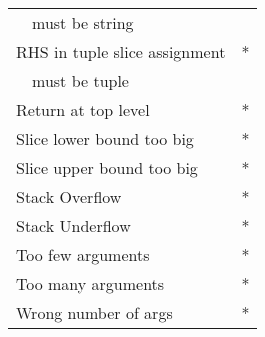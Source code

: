 {{\begin{center}
\begin{tabular}{l l}
~~must be string\\
RHS in tuple slice assignment &			*\\
~~must be tuple\\
Return at top level&                            *\\
Slice lower bound too big&			*\\
Slice upper bound too big&			*\\
Stack Overflow&					*\\
Stack Underflow&				*\\
Too few arguments&				*\\
Too many arguments&				*\\
Wrong number of args&			*\\
\end{tabular}
\end{center}
}

\pagebreak[0]
}
